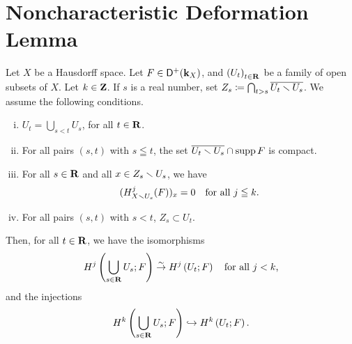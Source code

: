\section{Noncharacteristic Deformation Lemma}

\begin{Proposition+}\label{prp:t-nonchar}
  Let \(X\) be a Hausdorff space. 
  Let \(F\in\mathop{\mathsf{D}^\mathrm{+}}\nolimits(\mathbf{k}_X)\), and 
  \(\left(U_{t}\right)_{t\in\mathbf{R}}\) be a family of 
  open subsets of \(X\). 
  Let \(k\in\mathbf{Z}\). 
  If \(s\) is a real number, set \(
    Z_{s}\coloneqq \bigcap_{t>s}\overline{U_t\smallsetminus U_s}
  \). 
  We assume the following conditions. 
  \begin{enumerate}[(i)]
    \item \label{item:t-nonchar1}
    \(U_{t}=\bigcup_{s<t}U_{s}\), for all \(t\in\mathbf{R}\). 
    \item \label{item:t-nonchar2}
    For all pairs \((s,t)\) with \(s\leqq t\), 
    the set \(\overline{U_{t}\smallsetminus U_{s}}\cap \mathop{\mathrm{supp}}\nolimits{F}\) is compact.
    \item \label{item:t-nonchar3}
    For all \(s\in\mathbf{R}\) and all \(x\in Z_{s}\smallsetminus U_{s}\), 
    we have\[
      (H^{j}_{X\smallsetminus U_{s}}(F))_{x}=0
      \quad 
      \text{for all \(j\leqq k\).}
    \]
    \item \label{item:t-nonchar4} 
    For all pairs \((s,t)\) with \(s< t\), \(Z_s\subset U_{t}\).
  \end{enumerate}
  Then, for all \(t\in\mathbf{R}\), we have the isomorphisms\[
    H^{j}\left(\bigcup_{s\in\mathbf{R}}U_{s};F\right)
    \mathrel{\overset{\sim}{\rightarrow}} 
    H^{j}\left(U_{t};F\right)
    \quad \text{for all \(j< k\),} 
  \]
  and the injections\[
    H^{k}\left(\bigcup_{s\in\mathbf{R}}U_{s};F\right)
    \hookrightarrow 
    H^{k}\left(U_{t};F\right).
  \] 
\end{Proposition+}

